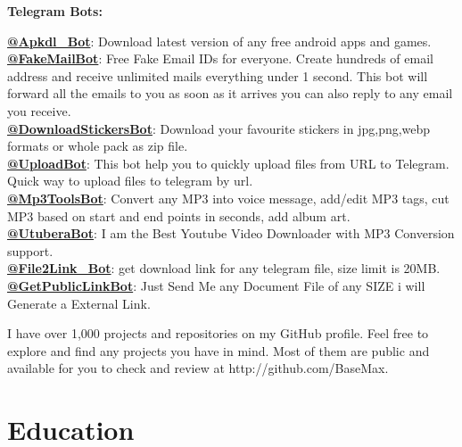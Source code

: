 \documentclass[a4paper,10pt]{article}
\begin{document}
\textbf{Telegram Bots:}\\
\begin{adjustwidth}{0.5cm}{0cm}
	\textbf{\href{https://t.me/apkdl_bot}{@Apkdl\_Bot}}: Download latest version of any free android apps and games.\\
	
	\textbf{\href{https://t.me/FakeMailBot}{@FakeMailBot}}: Free Fake Email IDs for everyone. Create hundreds of email address and receive unlimited mails everything under 1 second. This bot will forward all the emails to you as soon as it arrives you can also reply to any email you receive.\\
	
	\textbf{\href{https://t.me/DownloadStickersBot}{@DownloadStickersBot}}: Download your favourite stickers in jpg,png,webp formats or whole pack as zip file.\\
	
	\textbf{\href{https://t.me/uploadbot}{@UploadBot}}: This bot help you to quickly upload files from URL to Telegram. Quick way to upload files to telegram by url.\\
	
	\textbf{\href{https://t.me/mp3toolsbot}{@Mp3ToolsBot}}: Convert any MP3 into voice message, add/edit MP3 tags, cut MP3 based on start and end points in seconds, add album art.\\
	
	\textbf{\href{https://t.me/utuberabot}{@UtuberaBot}}: I am the Best Youtube Video Downloader with MP3 Conversion support.\\
	
	\textbf{\href{https://t.me/file2link_bot}{@File2Link\_Bot}}: get download link for any telegram file, size limit is 20MB.\\
	
	\textbf{\href{https://t.me/getpubliclinkbot}{@GetPublicLinkBot}}: Just Send Me any Document File of any SIZE i will Generate a External Link.
\end{adjustwidth}

I have over 1,000 projects and repositories on my GitHub profile. Feel free to explore and find any projects you have in mind. Most of them are public and available for you to check and review at http://github.com/BaseMax.

\section{\textbf{Education}}
\end{document}
